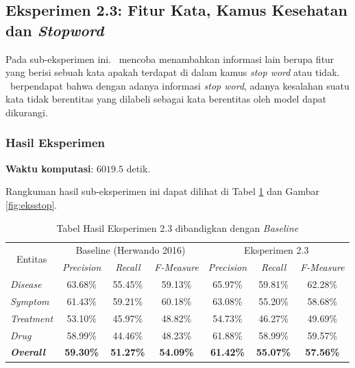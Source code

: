	\subsection{Eksperimen 2.3: Fitur Kata, Kamus Kesehatan dan \textit{Stopword}}\label{eks:subekstopword}
	Pada sub-eksperimen ini. \saya~mencoba menambahkan informasi lain berupa fitur yang berisi sebuah kata apakah terdapat di dalam kamus \textit{stop word} atau tidak. \Saya~berpendapat bahwa dengan adanya informasi \textit{stop word}, adanya kesalahan suatu kata tidak berentitas yang dilabeli sebagai kata berentitas oleh model dapat dikurangi.
	
	\subsubsection{Hasil Eksperimen}
	\textbf{Waktu komputasi}: $ 6019.5 $ detik.
	
	Rangkuman hasil sub-eksperimen ini dapat dilihat di Tabel \ref{table:eksstop} dan Gambar \ref{fig:eksstop}.
	

	\begin{table}
		\centering
		\caption{Tabel Hasil Eksperimen 2.3 dibandigkan dengan \textit{Baseline}}
		\begin{tabular}{|l|c|c|c|c|c|c|}
			\hline
			\multicolumn{1}{|c|}{\multirow{2}{*}{Entitas}} & \multicolumn{3}{c|}{Baseline (Herwando 2016)} & \multicolumn{3}{c|}{Eksperimen 2.3} \\ \cline{2-7} 
			\multicolumn{1}{|c|}{} & \textit{Precision} & \textit{Recall} & \textit{F-Measure} & \textit{Precision} & \textit{Recall} & \textit{F-Measure} \\ \hline
			\textit{Disease} & 63.68\% & 55.45\% & 59.13\% & 65.97\% & 59.81\% & 62.28\% \\ \hline
			\textit{Symptom} & 61.43\% & 59.21\% & 60.18\% & 63.08\% & 55.20\% & 58.68\% \\ \hline
			\textit{Treatment} & 53.10\% & 45.97\% & 48.82\% & 54.73\% & 46.27\% & 49.69\% \\ \hline
			\textit{Drug} & 58.99\% & 44.46\% & 48.23\% & 61.88\% & 58.99\% & 59.57\% \\ \hline
			\textit{\textbf{Overall}} & \textbf{59.30\%} & \textbf{51.27\%} & \textbf{54.09\%} & \textbf{61.42\%} & \textbf{55.07\%} & \textbf{57.56\%} \\ \hline
		\end{tabular}
		\label{table:eksstop}
	\end{table}
		
